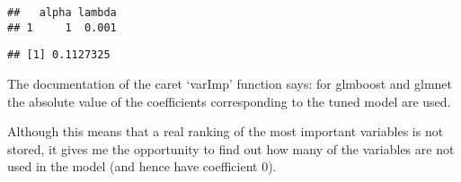 \documentclass[]{article}
\newenvironment{Shaded}{\begin{snugshade}}{\end{snugshade}}
\newcommand{\KeywordTok}[1]{\textcolor[rgb]{0.13,0.29,0.53}{\textbf{#1}}}
\newcommand{\DataTypeTok}[1]{\textcolor[rgb]{0.13,0.29,0.53}{#1}}
\newcommand{\DecValTok}[1]{\textcolor[rgb]{0.00,0.00,0.81}{#1}}
\newcommand{\FloatTok}[1]{\textcolor[rgb]{0.00,0.00,0.81}{#1}}
\newcommand{\StringTok}[1]{\textcolor[rgb]{0.31,0.60,0.02}{#1}}
\newcommand{\OperatorTok}[1]{\textcolor[rgb]{0.81,0.36,0.00}{\textbf{#1}}}
\newcommand{\NormalTok}[1]{#1}
\begin{document}
\begin{Shaded}
\end{Shaded}

\begin{verbatim}
##   alpha lambda
## 1     1  0.001
\end{verbatim}

\begin{Shaded}
\end{Shaded}

\begin{verbatim}
## [1] 0.1127325
\end{verbatim}

The documentation of the caret `varImp' function says: for glmboost and
glmnet the absolute value of the coefficients corresponding to the tuned
model are used.

Although this means that a real ranking of the most important variables
is not stored, it gives me the opportunity to find out how many of the
variables are not used in the model (and hence have coefficient 0).
\end{document}

